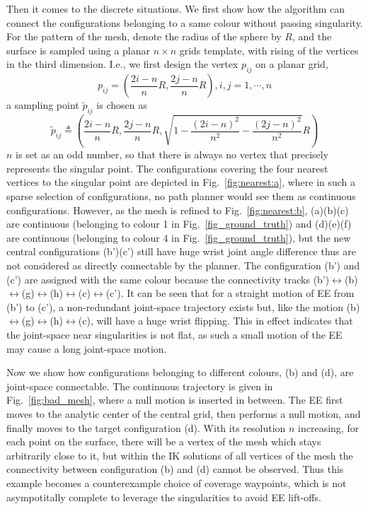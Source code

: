 \documentclass[Afour,sageh,times]{sagej}
\begin{document}
Then it comes to the discrete situations. 
We first show how the algorithm can connect the configurations belonging to a same colour without passing singularity. For the pattern of the mesh, denote the radius of the sphere by $R$, and the surface is sampled using a planar $n\times n$ grids template, with rising of the vertices in the third dimension. I.e., we first design the vertex $p_{ij}$ on a planar grid, 
\begin{equation}
p_{ij} = \left(\frac{2i-n}{n}R, \frac{2j-n}{n}R\right), i, j = 1, \cdots, n
\end{equation}
a sampling point $\tilde{p}_{ij}$ is chosen as
\begin{equation}
\tilde{p}_{ij} \triangleq \left(\frac{2i-n}{n}R, \frac{2j-n}{n}R, \sqrt{1 - \frac{(2i-n)^2}{n^2} - \frac{(2j-n)^2}{n^2}}R\right)
\end{equation}
$n$ is set as an odd number, so that there is always no vertex that precisely represents the singular point. 
The configurations covering the four nearest vertices to the singular point are depicted in Fig.~\ref{fig:nearest:a}, where in such a sparse selection of configurations, no path planner would see them as continuous configurations. However, as the mesh is refined to Fig.~\ref{fig:nearest:b}, (a)(b)(c) are continuous (belonging to colour 1 in Fig.~\ref{fig_ground_truth}) and (d)(e)(f) are continuous (belonging to colour 4 in Fig.~\ref{fig_ground_truth}), but the new central configurations (b')(c') still have huge wrist joint angle difference thus are not considered as directly connectable by the planner. 
The configuration (b') and (c') are assigned with the same colour because the connectivity tracks (b')$\leftrightarrow$(b)$\leftrightarrow$(g)$\leftrightarrow$(h)$\leftrightarrow$(c)$\leftrightarrow$(c'). 
It can be seen that for a straight motion of EE from (b') to (c'), a non-redundant joint-space trajectory exists but, like the motion (b)$\leftrightarrow$(g)$\leftrightarrow$(h)$\leftrightarrow$(c), will have a huge wrist flipping. 
This in effect indicates that the joint-space near singularities is not flat, as such a small motion of the EE may cause a long joint-space motion. 

Now we show how configurations belonging to different colours, (b) and (d), are joint-space connectable. 
The continuous trajectory is given in Fig.~\ref{fig:bad_mesh}, where a null motion is inserted in between. 
The EE first moves to the analytic center of the central grid, then performs a null motion, and finally moves to the target configuration (d). 
With its resolution $n$ increasing, for each point on the surface, there will be a vertex of the mesh which stays arbitrarily close to it, but within the IK solutions of all vertices of the mesh the connectivity between configuration (b) and (d) cannot be observed. 
Thus this example becomes a counterexample choice of coverage waypoints, which is not asympotitally complete to leverage the singularities to avoid EE lift-offs. 
\end{document}
